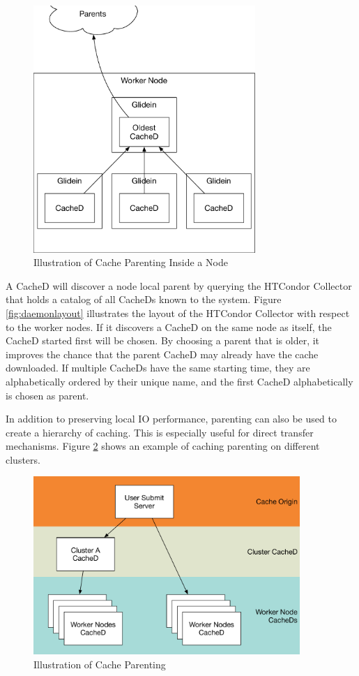 \begin{figure}[ht]
	\centering
	\includegraphics[width=0.75\textwidth]{images/ParentingInsideNode.pdf}
	\caption{Illustration of Cache Parenting Inside a Node}
	\label{fig:cacheparentingnode}
\end{figure}

A CacheD will discover a node local parent by querying the HTCondor Collector that holds a catalog of all CacheDs known to the system.  Figure \ref{fig:daemonlayout} illustrates the layout of the HTCondor Collector with respect to the worker nodes.  If it discovers a CacheD on the same node as itself, the CacheD started first will be chosen.  By choosing a parent that is older, it improves the chance that the parent CacheD may already have the cache downloaded.  If multiple CacheDs have the same starting time, they are alphabetically ordered by their unique name, and the first CacheD alphabetically is chosen as parent.

In addition to preserving local IO performance, parenting can also be used to create a hierarchy of caching.  This is especially useful for direct transfer mechanisms.  Figure \ref{fig:cacheparenting} shows an example of caching parenting on different clusters.

\begin{figure}[ht]
\centering
\includegraphics[width=0.9\textwidth]{images/CacheDParenting.pdf}
\caption{Illustration of Cache Parenting}
\label{fig:cacheparenting}
\end{figure}

